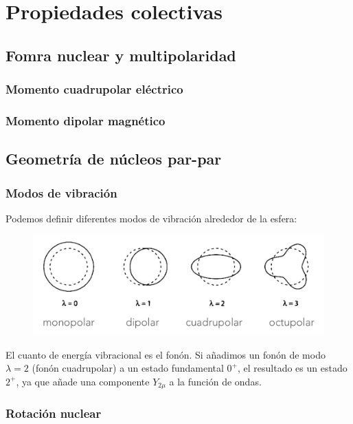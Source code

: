 \chapter{Propiedades colectivas}

\section{Fomra nuclear y multipolaridad}

\subsection{Momento cuadrupolar eléctrico}

\subsection{Momento dipolar magnético}

\section{Geometría de núcleos par-par}

\subsection{Modos de vibración}

Podemos definir diferentes modos de vibración alrededor de la esfera:

\begin{figure}[h!] \centering
    \includegraphics[width=0.9\linewidth]{Cuerpo/02_Modos_Vibracion.png}
\end{figure}
El cuanto de energía vibracional es el fonón. Si añadimos un fonón de modo $\lambda=2$ (fonón cuadrupolar) a un estado fundamental $0^+$, el resultado es un estado $2^+$, ya que añade una componente $Y_{2\mu}$ a la función de ondas. 


\subsection{Rotación nuclear}

